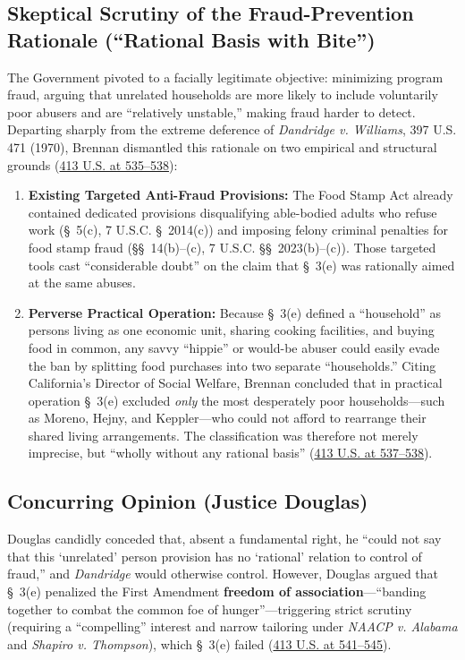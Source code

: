 \documentclass[12pt]{article}
\begin{document}
\subsection{Skeptical Scrutiny of the Fraud-Prevention Rationale (``Rational Basis with Bite'')}

The Government pivoted to a facially legitimate objective: minimizing program fraud, arguing that unrelated households are more likely to include voluntarily poor abusers and are ``relatively unstable,'' making fraud harder to detect. Departing sharply from the extreme deference of \textit{Dandridge v. Williams}, 397 U.S. 471 (1970), Brennan dismantled this rationale on two empirical and structural grounds (\href{https://supreme.justia.com/cases/federal/us/413/528/}{413 U.S. at 535--538}):
\begin{enumerate}
  \item \textbf{Existing Targeted Anti-Fraud Provisions:} The Food Stamp Act already contained dedicated provisions disqualifying able-bodied adults who refuse work (\S~5(c), 7 U.S.C. \S~2014(c)) and imposing felony criminal penalties for food stamp fraud (\S\S~14(b)--(c), 7 U.S.C. \S\S~2023(b)--(c)). Those targeted tools cast ``considerable doubt'' on the claim that \S~3(e) was rationally aimed at the same abuses.
  \item \textbf{Perverse Practical Operation:} Because \S~3(e) defined a ``household'' as persons living as one economic unit, sharing cooking facilities, and buying food in common, any savvy ``hippie'' or would-be abuser could easily evade the ban by splitting food purchases into two separate ``households.'' Citing California's Director of Social Welfare, Brennan concluded that in practical operation \S~3(e) excluded \textit{only} the most desperately poor households---such as Moreno, Hejny, and Keppler---who could not afford to rearrange their shared living arrangements. The classification was therefore not merely imprecise, but ``wholly without any rational basis'' (\href{https://supreme.justia.com/cases/federal/us/413/528/}{413 U.S. at 537--538}).
\end{enumerate}

\subsection{Concurring Opinion (Justice Douglas)}

Douglas candidly conceded that, absent a fundamental right, he ``could not say that this `unrelated' person provision has no `rational' relation to control of fraud,'' and \textit{Dandridge} would otherwise control. However, Douglas argued that \S~3(e) penalized the First Amendment \textbf{freedom of association}---``banding together to combat the common foe of hunger''---triggering strict scrutiny (requiring a ``compelling'' interest and narrow tailoring under \textit{NAACP v. Alabama} and \textit{Shapiro v. Thompson}), which \S~3(e) failed (\href{https://supreme.justia.com/cases/federal/us/413/528/}{413 U.S. at 541--545}).
\end{document}

